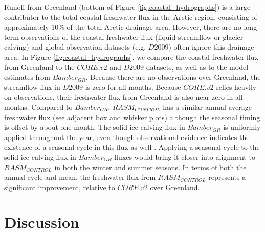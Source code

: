 \documentclass[jgrga, draft]{agutex}
\begin{document}
\begin{article}
Runoff from Greenland (bottom of Figure \ref{fig:coastal_hydrographs}) is a large contributor to the total coastal freshwater flux in the Arctic region, consisting of approximately 10\% of the total Arctic drainage area.
However, there are no long-term observations of the coastal freshwater flux (liquid streamflow or glacier calving) and global observation datasets (e.g. $D2009$) often ignore this drainage area.
In Figure \ref{fig:coastal_hydrographs}, we compare the coastal freshwater flux from Greenland to the $CORE.v2$ and $D2009$ datasets, as well as to the model estimates from $Bamber_{GR}$.
Because there are no observations over Greenland, the streamflow flux in $D2009$ is zero for all months.
Because $CORE.v2$ relies heavily on observations, their freshwater flux from Greenland is also near zero in all months.
Compared to $Bamber_{GR}$, $RASM_{CONTROL}$ has a similar annual average freshwater flux (see adjacent box and whisker plots) although the seasonal timing is offset by about one month.
The solid ice calving flux in $Bamber_{GR}$ is uniformly applied throughout the year, even though observational evidence indicates the existence of a seasonal cycle in this flux as well \citep[e.g.][]{Joughin_2008}.
Applying a seasonal cycle to the solid ice calving flux in $Bamber_{GR}$ fluxes would bring it closer into alignment to $RASM_{CONTROL}$ in both the winter and summer seasons.
In terms of both the annual cycle and mean, the freshwater flux from $RASM_{CONTROL}$ represents a significant improvement, relative to $CORE.v2$ over Greenland.

\section{Discussion}
\label{sec:discussion}


\end{article}
\end{document}
